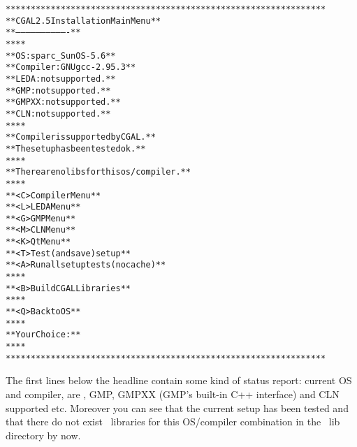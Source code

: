 {\ccTexHtml{\scriptsize}{} \label{pic:main-menu}
\begin{alltt}
  ****************************************************************
  **              CGAL 2.5 Installation Main Menu               **
  **              -------------------------------               **
  **                                                            **
  **   OS:                  sparc_SunOS-5.6                     **
  **   Compiler:            GNU gcc-2.95.3                      **
  **   LEDA:                not supported.                      **
  **   GMP:                 not supported.                      **
  **   GMPXX:               not supported.                      **
  **   CLN:                 not supported.                      **
  **                                                            **
  **   Compiler is supported by CGAL.                           **
  **   The setup has been tested ok.                            **
  **                                                            **
  **   There are no libs for this os/compiler.                  **
  **                                                            **
  **   <C>  Compiler Menu                                       **
  **   <L>  LEDA Menu                                           **
  **   <G>  GMP Menu                                            **
  **   <M>  CLN Menu                                            **
  **   <K>  Qt Menu                                             **
  **   <T>  Test (and save) setup                               **
  **   <A>  Run all setup tests (no cache)                      **
  **                                                            **
  **   <B>  Build CGAL Libraries                                **
  **                                                            **
  **   <Q>  Back to OS                                          **
  **                                                            **
  **   Your Choice:                                             **
  **                                                            **
  ****************************************************************
\end{alltt}}

The first lines below the headline contain some kind of status report:
current OS and compiler, are \leda, GMP, GMPXX (GMP's built-in C++ interface)
and CLN supported etc.
Moreover you can see that the current setup has been tested and that
there do not exist \cgal\ libraries for this OS/compiler combination
in the \cgal\ lib directory by now.


